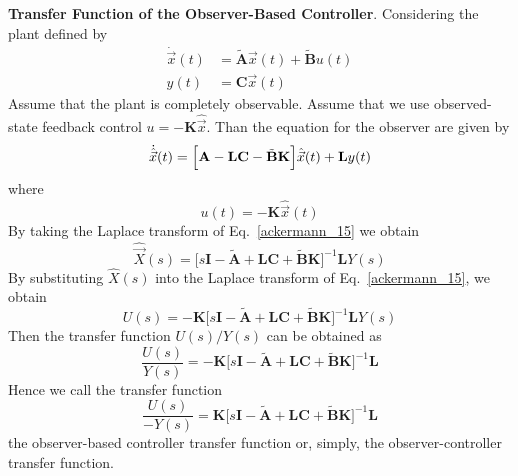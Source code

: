 \documentclass[12pt,a4paper,oneside]{book}
\begin{document}
\begin{onehalfspace}
\vspace{5mm}
\textbf{Transfer Function of the Observer-Based Controller}. Considering the 
plant defined by
\begin{equation}
	\begin{split}
		\dot{\vec x}(t) & = \tilde{\mathbf{A}}\vec{x}(t)+ 
		\tilde{\mathbf{B}}u(t) \\
		y(t) & = \mathbf{C}\vec x(t)
	\end{split}
\end{equation} 
Assume that the plant is completely observable. Assume that we use 
observed-state feedback control $u=-\mathbf{K}\hat{\vec{x}}$. Than the equation 
for the observer are given by
\begin{equation} \label{ackermann_14}
	\dot{\hat{\vec x}}(t) = \Big[\mathbf{A} - \mathbf{LC} - 
	\tilde{\mathbf{B}}\mathbf{K}\Big]\hat{\vec x}(t) + 
	\mathbf{L}y(t) \\
\end{equation}
where
\begin{equation} \label{ackermann_15}
	u(t) = -\mathbf{K}\hat{\vec x}(t)
\end{equation}
By taking the Laplace transform of Eq.~\eqref{ackermann_15} we obtain 
\begin{equation}
	\hat{\vec{X}}(s) = \Big[s\mathbf{I} - \tilde{\mathbf{A}} + \mathbf{LC} + 
	\tilde{\mathbf{B}}\mathbf{K}\Big]^{-1}\mathbf{L}Y(s)
\end{equation} 
By substituting $\hat{X}(s)$ into the Laplace transform of 
Eq.~\eqref{ackermann_15}, we obtain
\begin{equation}\label{ackermann_16}
	U(s) = -\mathbf{K}\Big[s\mathbf{I} - \tilde{\mathbf{A}} + \mathbf{LC} + 
	\tilde{\mathbf{B}}\mathbf{K}\Big]^{-1}\mathbf{L}Y(s)
\end{equation} 
Then the transfer function $U(s)/Y(s)$ can be obtained as 
\begin{equation}
	\frac{U(s)}{Y(s)} = -\mathbf{K}\Big[s\mathbf{I} - \tilde{\mathbf{A}} + 
	\mathbf{LC} + \tilde{\mathbf{B}}\mathbf{K}\Big]^{-1}\mathbf{L}
\end{equation} 
Hence we call the transfer function 
\begin{equation}\label{ackermann_17}
	\frac{U(s)}{-Y(s)} = \mathbf{K}\Big[s\mathbf{I} - \tilde{\mathbf{A}} + 
	\mathbf{LC} + \tilde{\mathbf{B}}\mathbf{K}\Big]^{-1}\mathbf{L}
\end{equation} 
the observer-based controller transfer function or, simply, the 
observer-controller transfer function. 


\end{onehalfspace}
\end{document}
